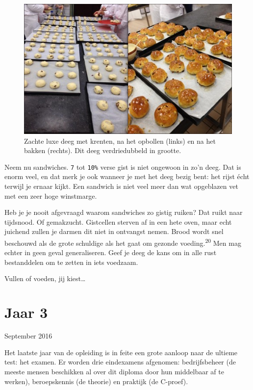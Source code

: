\documentclass[
  11pt,
  dutch,
]{memoir}
\begin{document}
\begin{figure}
    \centering
    \includegraphics{img/bw/sandwiches.jpg}
    \caption[Zachte luxe deeg met krenten.]{Zachte luxe deeg met krenten, na het opbollen (links) en na het
    bakken (rechts). Dit deeg verdriedubbeld in grootte.}
\end{figure}

Neem nu sandwiches. \texttt{7} tot \texttt{10\%} verse gist is niet
ongewoon in zo'n deeg. Dat is enorm veel, en dat merk je ook wanneer je
met het deeg bezig bent: het rijst écht terwijl je ernaar kijkt. Een
sandwich is niet veel meer dan wat opgeblazen vet met een zeer hoge
winstmarge.

Heb je je nooit afgevraagd waarom sandwiches zo gistig ruiken? Dat ruikt
naar tijdsnood. Of gemakzucht. Gistcellen sterven af in een hete oven,
maar echt juichend zullen je darmen dit niet in ontvangst nemen. Brood
wordt snel beschouwd als de grote schuldige als het gaat om gezonde
voeding.\textsuperscript{20} Men mag echter in geen geval generaliseren.
Geef je deeg de kans om in alle rust bestanddelen om te zetten in iets
voedzaam.

Vullen of voeden, jij kiest\ldots{}

\hypertarget{jaar-3}{%
\section{Jaar 3}\label{jaar-3}}

\begin{flushright}
September 2016
\end{flushright}

Het laatste jaar van de opleiding is in feite een grote aanloop naar de
ultieme test: het examen. Er worden drie eindexamens afgenomen:
bedrijfsbeheer (de meeste mensen beschikken al over dit diploma door hun
middelbaar af te werken), beroepskennis (de theorie) en praktijk (de
C-proef).
\end{document}
